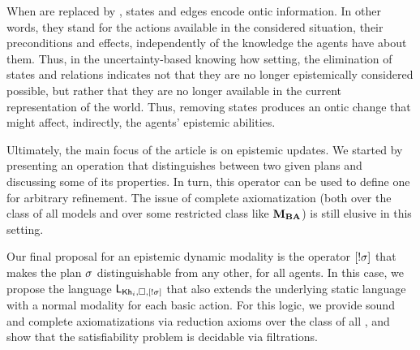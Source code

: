 \begin{mrevised}
When  are replaced by , states and edges encode ontic information. In other words, they stand for the actions available in the considered situation, their preconditions and effects, independently of the knowledge the agents have about them.  
%
%
Thus, in the uncertainty-based knowing how setting, the elimination of states and relations indicates not that they are no longer epistemically considered possible, but rather that they are no longer available in the current representation of the world. 
Thus, removing states produces an ontic change that might affect,
indirectly, the agents’ epistemic abilities. 


Ultimately, the main focus of the article is on epistemic updates.  We started by presenting an operation that distinguishes between two given plans and discussing some of its properties. In turn, this operator can be used to define one for arbitrary refinement. The issue of complete axiomatization (both over the class of all models and over some restricted class like $\mathbf{M}_{\mathbf{BA}}$) is still elusive in this setting. 

Our final proposal for an epistemic dynamic modality is the operator $[!\sigma]$ that makes the plan $\sigma$ distinguishable from any other, for all agents. In this case, we propose the language $\mathsf{L}_{{\sf Kh}_i,\square,[!\sigma]}$ that also extends the underlying static language with a normal modality for each basic action. For this logic, we provide sound and complete axiomatizations via reduction axioms over the class of all , and show that the satisfiability problem is decidable via filtrations.  


\end{mrevised}
